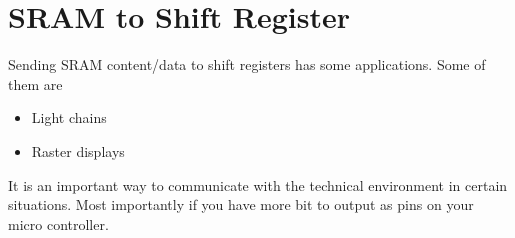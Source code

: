\section{SRAM to Shift Register}

Sending SRAM content/data to shift registers has some applications. Some of them are

\begin{itemize}
  \item {Light chains}
  \item {Raster displays}
\end{itemize}

It is an important way to communicate with the technical environment in certain situations. Most importantly if you have more bit to output as pins on your micro controller.